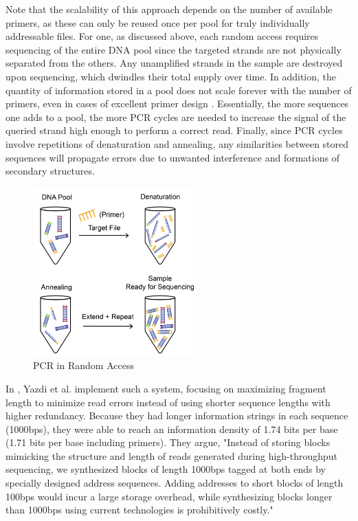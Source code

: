 \documentclass[a4paper,conference]{IEEEtran}
\begin{document}
Note that the scalability of this approach depends on the number of available primers, as these can only be reused once per pool for truly individually addressable files. For one, as discussed above, each random access requires sequencing of the entire DNA pool since the targeted strands are not physically separated from the others. Any unamplified strands in the sample are destroyed upon sequencing, which dwindles their total supply over time. In addition, the quantity of information stored in a pool does not scale forever with the number of primers, even in cases of excellent primer design \cite{banal_random_2021}. Essentially, the more sequences one adds to a pool, the more PCR cycles are needed to increase the signal of the queried strand high enough to perform a correct read. Finally, since PCR cycles involve repetitions of denaturation and annealing, any similarities between stored sequences will propagate errors due to unwanted interference and formations of secondary structures.


\begin{figure}[!t]
\centering
\includegraphics[width=2.5in]{images/pcrrandomaccess}
\caption{PCR in Random Access}
\label{pcrrandomaccess}
\end{figure}

In \cite{yazdi_rewritable_2015}, Yazdi et al. implement such a system, focusing on maximizing fragment length to minimize read errors instead of using shorter sequence lengths with higher redundancy. Because they had longer information strings in each sequence (1000bps), they were able to reach an information density of 1.74 bits per base (1.71 bits per base including primers). They argue, "Instead of storing blocks mimicking the structure and length of reads generated during high-throughput sequencing, we synthesized blocks of length 1000bps tagged at both ends by specially designed address sequences. Adding addresses to short blocks of length 100bps would incur a large storage overhead, while synthesizing blocks longer than 1000bps using current technologies is prohibitively costly."
\end{document}
